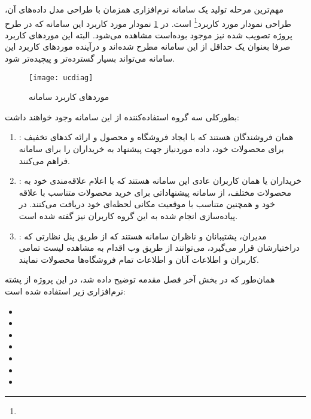 \newpage


مهم‌ترین مرحله تولید یک سامانه نرم‌افزاری همزمان با طراحی مدل داده‌های آن، طراحی نمودار مورد کاربرد\footnote{} است. در \cref{fig:ucdiag} نمودار مورد کاربرد این سامانه که در طرح پروژه تصویب شده نیز موجود بوده‌است مشاهده می‌شود. البته این موردهای کاربرد صرفا بعنوان یک حداقل از این سامانه مطرح شده‌اند و درآینده موردهای کاربرد این سامانه می‌تواند بسیار گسترده‌تر و پیچیده‌تر شود.

\begin{figure}[H]
	\centering
	\texttt{[image: ucdiag]}
	\caption{موردهای کاربرد سامانه}
	\label{fig:ucdiag}
\end{figure}

بطورکلی سه گروه استفاده‌کننده از این سامانه وجود خواهند داشت:
\begin{enumerate}
	\item {}: همان فروشندگان هستند که با ایجاد فروشگاه و محصول و ارائه کدهای تخفیف برای محصولات خود، داده موردنیاز جهت پیشنهاد به خریداران را برای سامانه فراهم می‌کنند.
	\item {}: خریداران یا همان کاربران عادی این سامانه هستند که با اعلام علاقه‌مندی خود به محصولات مختلف، از سامانه پیشنهاداتی برای خرید محصولات متناسب با علاقه خود و همچنین متناسب با موقعیت مکانی لحظه‌ای خود دریافت می‌کنند. در پیاده‌سازی انجام شده به این گروه کاربران  نیز گفته شده است.
	\item {}: مدیران، پشتیبانان و ناظران سامانه هستند که از طریق پنل نظارتی که دراختیارشان قرار می‌گیرد، می‌توانند از طریق وب اقدام به مشاهده لیست تمامی کاربران و اطلاعات آنان و اطلاعات تمام فروشگاه‌ها محصولات نمایند.
\end{enumerate}

\newpage


همان‌طور که در بخش آخر فصل مقدمه توضیح داده شد، در این پروژه از پشته نرم‌افزاری زیر استفاده شده است:

\begin{itemize}
	\item {}
	\item {}
	\item {}
	\item {}
	\item {}				
	\item {}
	\item {}
\end{itemize}

